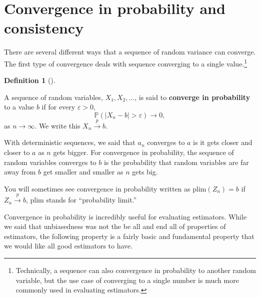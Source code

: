 \documentclass[
  letterpaper,
  DIV=11,
  numbers=noendperiod]{scrreprt}
\renewcommand{\P}{\mathbb{P}}
\newcommand{\inprob}{\overset{p}{\to}}
\theoremstyle{definition}
\newtheorem{definition}{Definition}[chapter]
\theoremstyle{plain}
\theoremstyle{definition}
\theoremstyle{remark}
\begin{document}
\hypertarget{convergence-in-probability-and-consistency}{%
\section{Convergence in probability and
consistency}\label{convergence-in-probability-and-consistency}}

There are several different ways that a sequence of random variance can
converge. The first type of convergence deals with sequence converging
to a single value.\footnote{Technically, a sequence can also convergence
  in probability to another random variable, but the use case of
  converging to a single number is much more commonly used in evaluating
  estimators.}

\leavevmode{}%
\begin{definition}[]\label{def-inprob}

A sequence of random variables, \(X_1, X_2, \ldots\), is said to
\textbf{converge in probability} to a value \(b\) if for every
\(\varepsilon > 0\), \[
\P(|X_n - b| > \varepsilon) \rightarrow 0,
\] as \(n\rightarrow \infty\). We write this \(X_n \inprob b\).

\end{definition}

With deterministic sequences, we said that \(a_n\) converges to \(a\) is
it gets closer and closer to \(a\) as \(n\) gets bigger. For convergence
in probability, the sequence of random variables converges to \(b\) is
the probability that random variables are far away from \(b\) get
smaller and smaller as \(n\) gets big.

\begin{tcolorbox}[enhanced jigsaw, title=\textcolor{quarto-callout-note-color}{\faInfo}\hspace{0.5em}{Notation alert}, breakable, titlerule=0mm, opacityback=0, rightrule=.15mm, bottomrule=.15mm, colframe=quarto-callout-note-color-frame, coltitle=black, colbacktitle=quarto-callout-note-color!10!white, bottomtitle=1mm, toptitle=1mm, colback=white, arc=.35mm, opacitybacktitle=0.6, toprule=.15mm, leftrule=.75mm, left=2mm]

You will sometimes see convergence in probability written as
\(\text{plim}(Z_n) = b\) if \(Z_n \inprob b\), \(\text{plim}\) stands
for ``probability limit.''

\end{tcolorbox}

Convergence in probability is incredibly useful for evaluating
estimators. While we said that unbiasedness was not the be all and end
all of properties of estimators, the following property is a fairly
basic and fundamental property that we would like all good estimators to
have.
\end{document}
